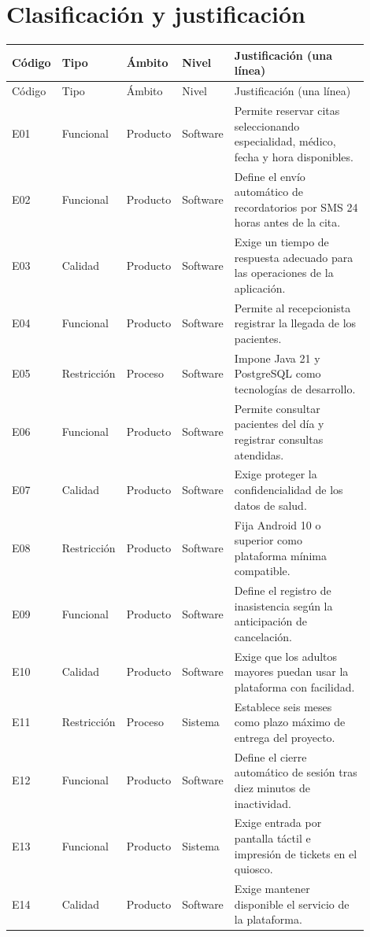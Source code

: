 \documentclass[11pt,a4paper]{article}
\begin{document}
\section{Clasificación y justificación}
\small
\begin{longtable}{@{}p{0.08\linewidth}p{0.12\linewidth}p{0.12\linewidth}p{0.12\linewidth}p{0.46\linewidth}@{}}
\toprule Código & Tipo & Ámbito & Nivel & Justificación (una línea)\\\midrule\endfirsthead
\toprule Código & Tipo & Ámbito & Nivel & Justificación (una línea)\\\midrule\endhead
E01 & Funcional & Producto & Software & Permite reservar citas seleccionando especialidad, médico, fecha y hora disponibles. \\
E02 & Funcional & Producto & Software & Define el envío automático de recordatorios por SMS 24 horas antes de la cita. \\
E03 & Calidad & Producto & Software & Exige un tiempo de respuesta adecuado para las operaciones de la aplicación. \\
E04 & Funcional & Producto & Software & Permite al recepcionista registrar la llegada de los pacientes. \\
E05 & Restricción & Proceso & Software & Impone Java 21 y PostgreSQL como tecnologías de desarrollo. \\
E06 & Funcional & Producto & Software & Permite consultar pacientes del día y registrar consultas atendidas. \\
E07 & Calidad & Producto & Software & Exige proteger la confidencialidad de los datos de salud. \\
E08 & Restricción & Producto & Software & Fija Android 10 o superior como plataforma mínima compatible. \\
E09 & Funcional & Producto & Software & Define el registro de inasistencia según la anticipación de cancelación. \\
E10 & Calidad & Producto & Software & Exige que los adultos mayores puedan usar la plataforma con facilidad. \\
E11 & Restricción & Proceso & Sistema & Establece seis meses como plazo máximo de entrega del proyecto. \\
E12 & Funcional & Producto & Software & Define el cierre automático de sesión tras diez minutos de inactividad. \\
E13 & Funcional & Producto & Sistema & Exige entrada por pantalla táctil e impresión de tickets en el quiosco. \\
E14 & Calidad & Producto & Software & Exige mantener disponible el servicio de la plataforma. \\

\end{longtable}
\end{document}
